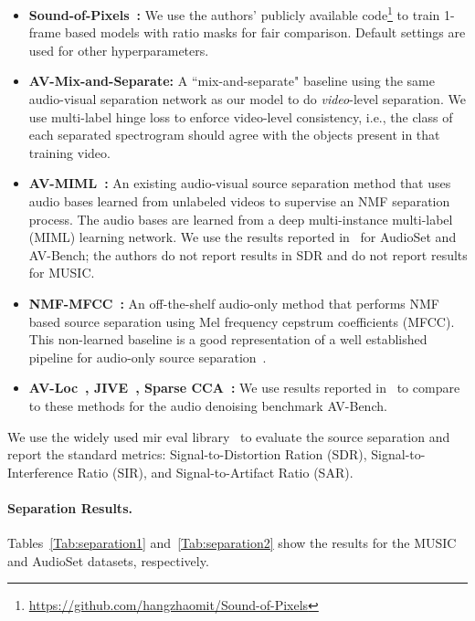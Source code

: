 \documentclass[10pt,twocolumn,letterpaper]{article}
\begin{document}
\begin{itemize}
\itemsep0em
\item \textbf{Sound-of-Pixels~\cite{zhao2018sound}:} We use the authors' publicly available code\footnote{\url{https://github.com/hangzhaomit/Sound-of-Pixels}} to train 1-frame based models with ratio masks for fair comparison. Default settings are used for other hyperparameters. 
\item \textbf{AV-Mix-and-Separate:} A ``mix-and-separate" baseline using the same audio-visual separation network as our model to do \emph{video}-level separation.  We use multi-label hinge loss to enforce video-level consistency, i.e., the class of each separated spectrogram should agree with the objects present in that training video.
\item \textbf{AV-MIML~\cite{gao2018objectSounds}:} An existing audio-visual source separation method that uses audio bases learned from unlabeled videos to supervise an NMF separation process. The audio bases are learned from a deep multi-instance multi-label (MIML) learning network. We use the results reported in~\cite{gao2018objectSounds} for AudioSet and AV-Bench; the authors do not report results in SDR and do not report results for MUSIC.
\item \textbf{NMF-MFCC~\cite{spiertz2009source}:} An off-the-shelf audio-only method that performs NMF based source separation using Mel frequency cepstrum coefficients (MFCC). This non-learned baseline is a good representation of a well established pipeline for audio-only source separation~\cite{virtanen2003sound,innami2012nmf,jaiswal2011clustering,guo2015nmf}.
\item \textbf{AV-Loc~\cite{pu2017audio}, JIVE~\cite{lock2013joint}, Sparse CCA~\cite{kidron2005pixels}:}  We use results reported in~\cite{gao2018objectSounds} to compare to these methods for the audio denoising benchmark AV-Bench.
\end{itemize}
\vspace*{-0.05in}

We use the widely used mir eval library~\cite{raffel2014mir_eval} to evaluate the source separation and report the standard metrics: Signal-to-Distortion Ration (SDR), Signal-to-Interference Ratio (SIR), and Signal-to-Artifact Ratio (SAR).

\vspace*{-0.15in}
\paragraph{Separation Results.} Tables~\ref{Tab:separation1} and~\ref{Tab:separation2} show the results for the MUSIC and AudioSet datasets, respectively.
\end{document}
